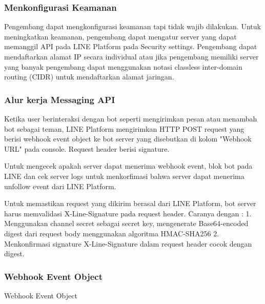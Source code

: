 
\subsubsection{Menkonfigurasi Keamanan}
Pengembang dapat mengkonfigurasi keamanan tapi tidak wajib dilakukan. Untuk meningkatkan keamanan, pengembang dapat mengatur server yang dapat memanggil API pada LINE Platform pada Security settings. Pengembang dapat mendaftarkan alamat IP secara individual atau jika pengembang memiliki server yang banyak pengembang dapat menggunakan notasi classless inter-domain routing (CIDR) untuk mendaftarkan alamat jaringan.

\subsubsection{Alur kerja Messaging API}
Ketika user berinteraksi dengan bot seperti mengirimkan pesan atau menambah bot sebagai teman, LINE Platform mengirimkan HTTP POST request yang berisi webhook event object ke bot server yang disebutkan di kolom "Webhook URL" pada console. Request header berisi signature. 

Untuk mengecek apakah server dapat menerima webhook event, blok bot pada LINE dan cek server logs untuk menkorfimasi bahwa server dapat menerima unfollow event dari LINE Platform.


Untuk memastikan request yang dikirim berasal dari LINE Platform, bot server harus memvalidasi X-Line-Signature pada request header. Caranya dengan :
1. Menggunakan channel secret sebagai secret key, mengenerate Base64-encoded digest dari request body menggunakan algoritma HMAC-SHA256
2. Menkonfirmasi signature X-Line-Signature dalam request header cocok dengan digest.


\subsubsection{Webhook Event Object}
Webhook Event Object

